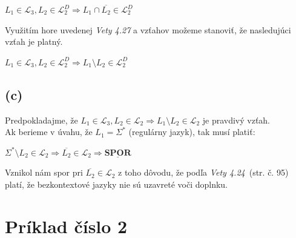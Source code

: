 \documentclass[11pt,a4paper]{article}
\begin{document}
\begin{center}
$L_1 \in \mathcal{L}_3, L_2 \in \mathcal{L}_2^D \Rightarrow L_1 \cap \overline{L_2} \in \mathcal{L}_2^D$
\end{center}

Využitím hore uvedenej \textit{Vety 4.27} a vzťahov možeme stanoviť, že nasledujúci vzťah je platný.

\begin{center}
$L_1 \in \mathcal{L}_3, L_2 \in \mathcal{L}_2^D \Rightarrow L_1 \setminus L_2 \in \mathcal{L}_2^D$
\end{center}


\subsection{(c)} %


Predpokladajme, že $L_1 \in \mathcal{L}_3, L_2 \in \mathcal{L}_2 \Rightarrow L_1 \setminus L_2 \in \mathcal{L}_2$ je pravdivý vzťah.\\

Ak berieme v úvahu, že $L_1 = \Sigma^*$ (regulárny jazyk), tak musí platiť:
\begin{center}
$\Sigma^* \setminus L_2 \in \mathcal{L}_2 \Rightarrow \overline{L_2} \in \mathcal{L}_2 \Rightarrow \underline{\textbf{SPOR}}$
\end{center}

Vznikol nám spor pri $\overline{L_2} \in \mathcal{L}_2$ z toho dôvodu, že podľa \textit{Vety 4.24}~\cite{TIN}(str. č. 95) platí, že bezkontextové jazyky nie sú uzavreté voči doplnku.

\newpage
\section{Príklad číslo 2} %
\end{document}
